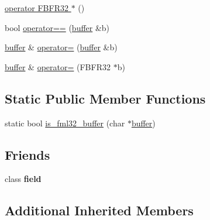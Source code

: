 \begin{DoxyCompactItemize}
\hyperlink{classatmi_1_1buffer_a79e82bc3f9dac86efc685604c20ed78d}{operator F\+B\+F\+R32 $\ast$} ()
\item 
bool \hyperlink{classatmi_1_1buffer_aa095219e6aa1470c96dc2b3d4ddeeb98}{operator==} (\hyperlink{classatmi_1_1buffer}{buffer} \&b)
\item 
\hyperlink{classatmi_1_1buffer}{buffer} \& \hyperlink{classatmi_1_1buffer_a878220e2ba9a66a991c77b20fd52ff09}{operator=} (\hyperlink{classatmi_1_1buffer}{buffer} \&b)
\item 
\hyperlink{classatmi_1_1buffer}{buffer} \& \hyperlink{classatmi_1_1buffer_a4efc77b0773f85c06d391af8a7ebe98a}{operator=} (F\+B\+F\+R32 $\ast$b)
\end{DoxyCompactItemize}
\subsection*{Static Public Member Functions}
\begin{DoxyCompactItemize}
\item 
static bool \hyperlink{classatmi_1_1buffer_a38aca9956db23474cb19d4c737b08262}{is\+\_\+fml32\+\_\+buffer} (char $\ast$\hyperlink{classatmi_1_1buffer}{buffer})
\end{DoxyCompactItemize}
\subsection*{Friends}
\begin{DoxyCompactItemize}
\item 
\hypertarget{classatmi_1_1buffer_acd53905ae10cba58b4337aefe648aec6}{class {\bfseries field}}\label{classatmi_1_1buffer_acd53905ae10cba58b4337aefe648aec6}

\end{DoxyCompactItemize}
\subsection*{Additional Inherited Members}


